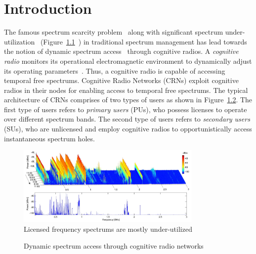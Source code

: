 \chapter{Introduction}\label{intro}
The famous spectrum scarcity problem~\cite{SpectrumScarcity} along with significant spectrum under-utilization~\cite{valenta2010survey} (Figure~\ref{fig:SpectrumUnderutilization}~\cite{valenta2010survey}) in traditional spectrum management has lead towards the notion of dynamic spectrum access~\cite{akyildiz2006next} through cognitive radios. A \textit{cognitive radio} monitors its operational electromagnetic environment to dynamically adjust its operating parameters~\cite{Mitola}. Thus, a cognitive radio is capable of accessing temporal free spectrums. Cognitive Radio Networks (CRNs) exploit cognitive radios in their nodes for enabling access to temporal free spectrums. The typical architecture of CRNs comprises of two types of users as shown in Figure~\ref{fig:crn}. The first type of users refers to \textit{primary users} (PUs), who possess licenses to operate over different spectrum bands. The second type of users refers to \textit{secondary users} (SUs), who are unlicensed and employ cognitive radios to opportunistically access instantaneous spectrum holes.


\begin{figure}[!htbp]
    \begin{center}
        \includegraphics[width=0.8\textwidth]{myFigures/SpectrumUnderutilizationSir.PNG}
        \caption{Licensed frequency spectrums are mostly under-utilized}
        \label{fig:SpectrumUnderutilization}
    \end{center}
\end{figure}

\begin{figure}[!htbp]
    \begin{center}
        
        \caption{Dynamic spectrum access through cognitive radio networks}
        \label{fig:crn}
    \end{center}
\end{figure}

